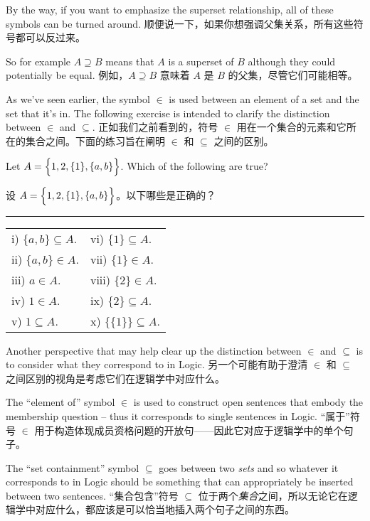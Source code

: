 By the way, if you want to emphasize the superset
relationship, all of these symbols can be turned around.
顺便说一下，如果你想强调父集关系，所有这些符号都可以反过来。

So for example
$A \supseteq B$ means that $A$ is a superset of $B$ although they could
potentially be equal.
例如，$A \supseteq B$ 意味着 $A$ 是 $B$ 的父集，尽管它们可能相等。

As we've seen earlier, the symbol $\in$ is used between an element of
a set and the set that it's in.  The following exercise is intended to
clarify the distinction between $\in$ and $\subseteq$.
正如我们之前看到的，符号 $\in$ 用在一个集合的元素和它所在的集合之间。下面的练习旨在阐明 $\in$ 和 $\subseteq$ 之间的区别。
\begin{exer}
Let $A = \left\{ \rule{0pt}{10pt} 1, 2, \{ 1 \}, \{ a, b \} \right\}$.
Which of the following are true?

设 $A = \left\{ \rule{0pt}{10pt} 1, 2, \{ 1 \}, \{ a, b \} \right\}$。以下哪些是正确的？

\vfill

\rule{72pt}{0pt} \begin{tabular}{ll}
i) $ \{ a, b \} \subseteq A$. & vi) $  \{ 1 \} \subseteq A$.\\
ii) $ \{ a, b \} \in A$. & vii) $  \{ 1 \} \in A$.\\
iii) $  a \in A$. & viii) $  \{ 2 \} \in A$.\\
iv) $  1 \in A$. & ix) $  \{ 2 \} \subseteq A$.\\
v) $  1 \subseteq A$. & x) $  \{\{1\}\} \subseteq A$.\\
\end{tabular}
\end{exer}

\newpage

Another perspective that may help clear up the distinction between
$\in$ and $\subseteq$ is to consider what they correspond to in Logic.
另一个可能有助于澄清 $\in$ 和 $\subseteq$ 之间区别的视角是考虑它们在逻辑学中对应什么。

The ``element of'' symbol $\in$ is used to construct open sentences
that embody the membership question -- thus it corresponds to single
sentences in Logic.
“属于”符号 $\in$ 用于构造体现成员资格问题的开放句——因此它对应于逻辑学中的单个句子。

The ``set containment'' symbol $\subseteq$ goes
between two \emph{sets} and so whatever it corresponds to in Logic
should be something that can appropriately be inserted between two
sentences.
“集合包含”符号 $\subseteq$ 位于两个\emph{集合}之间，所以无论它在逻辑学中对应什么，都应该是可以恰当地插入两个句子之间的东西。

